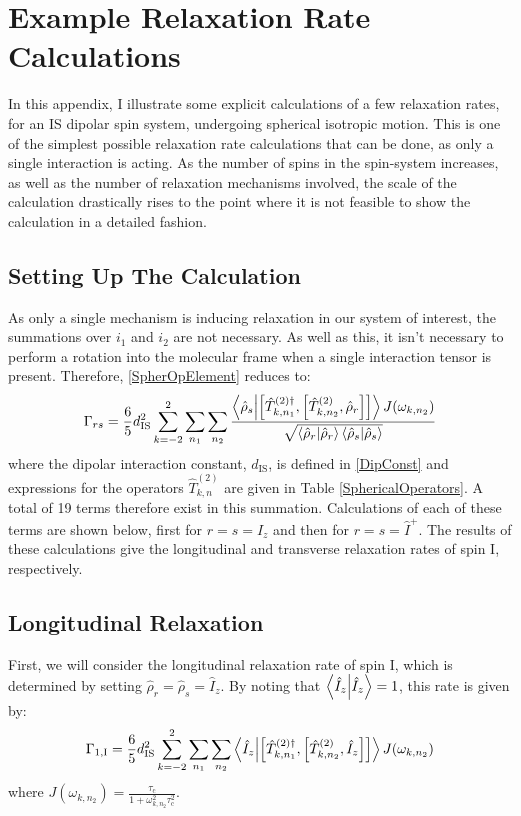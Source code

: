 \chapter{Example Relaxation Rate Calculations} \label{chapB}
\allowdisplaybreaks

\begin{appendixtext}
In this appendix, I illustrate some explicit calculations of a few relaxation rates, for an IS dipolar spin system, undergoing spherical isotropic motion. This is one of the simplest possible relaxation rate calculations that can be done, as only a single interaction is acting. As the number of spins in the spin-system increases, as well as the number of relaxation mechanisms involved, the scale of the calculation drastically rises to the point where it is not feasible to show the calculation in a detailed fashion.\\

\section{Setting Up The Calculation} \label{secB.1}
As only a single mechanism is inducing relaxation in our system of interest, the summations over $i_1$ and $i_2$ are not necessary. As well as this, it isn't necessary to perform a rotation into the molecular frame when a single interaction tensor is present. Therefore, \ref{SpherOpElement} reduces to: 
\begin{equation}
\label{eqB.1}
\Gamma_{rs} = \frac{6}{5} d_{\text{IS}}^2 \sum \limits_{k = -2}^2 \sum \limits_{n_1} \sum \limits_{n_2} \frac{\bra{\hat{\rho}_s} \ket{\comm{\hat{T}_{k, n_1}^{(2) \dagger}}{\comm{\hat{T}_{k,n_2}^{(2)}}{\hat{\rho}_r}}} J(\omega_{k,n_2})}{\sqrt{\bra{\hat{\rho}_r} \ket{\hat{\rho}_r} \bra{\hat{\rho}_s} \ket{\hat{\rho}_s}}}
\end{equation}
where the dipolar interaction constant, $d_{\text{IS}}$, is defined in \ref{DipConst} and expressions for the operators $\hat{T}_{k,n}^{(2)}$ are given in Table \ref{SphericalOperators}. A total of 19 terms therefore exist in this summation. Calculations of each of these terms are shown below, first for $r=s=\hat{I}_z$ and then for $r=s=\hat{I}^+$. The results of these calculations give the longitudinal and transverse relaxation rates of spin I, respectively.
\section{Longitudinal Relaxation} \label{secB.2}
First, we will consider the longitudinal relaxation rate of spin I, which is determined by setting $\hat{\rho}_r = \hat{\rho}_s = \hat{I}_z$. By noting that $\bra{\hat{I}_z} \ket{\hat{I}_z} = 1$, this rate is given by:
\begin{equation}
\label{eqB.2}
\Gamma_{1,\text{I}} = \frac{6}{5} d_{\text{IS}}^2 \sum \limits_{k = -2}^2 \sum \limits_{n_1} \sum \limits_{n_2} \bra{\hat{I}_z} \ket{\comm{\hat{T}_{k, n_1}^{(2) \dagger}}{\comm{\hat{T}_{k,n_2}^{(2)}}{\hat{I}_z}}} J(\omega_{k,n_2})
\end{equation}
where $J(\omega_{k,n_2}) = \frac{\tau_{\text{c}}}{1 + \omega_{k,n_2}^2\tau_{\text{c}}^2}$.

\end{appendixtext}
